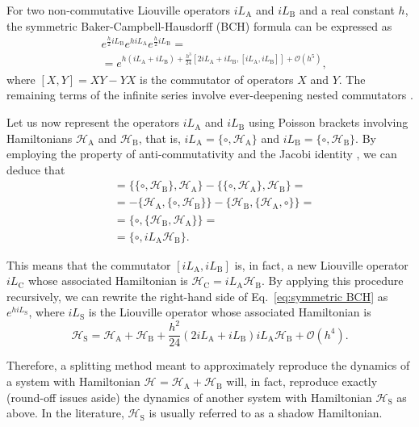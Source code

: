 \documentclass[
	aip,
	jcp,
	reprint,
]{revtex4-1}
\newcommand{\Ham}[1]{{\mathcal H}_\text{#1}}           %
\newcommand{\Liu}[1]{i\!L_\text{#1}}                   %
\newcommand{\timestep}{h}
\begin{document}
For two non-commutative Liouville operators $\Liu A$ and $\Liu B$ and a real constant $\timestep$, the symmetric Baker-Campbell-Hausdorff (BCH) formula can be expressed as \cite{Hairer_2006}
\begin{equation}
\label{eq:symmetric BCH}
\begin{split}
&e^{\frac{\timestep}{2} \Liu B} e^{\timestep \Liu A} e^{\frac{\timestep}{2} \Liu B} = \\
&= e^{\timestep (\Liu A + \Liu B) + \frac{\timestep^3}{24} \left[2 \Liu A + \Liu B,[\Liu A,\Liu B]\right] + \mathcal{O}(\timestep^5)},
\end{split}
\end{equation}
where $[X,Y] = XY - YX$ is the commutator of operators $X$ and $Y$.
The remaining terms of the infinite series involve ever-deepening nested commutators \cite{Hairer_2006}.

Let us now represent the operators $\Liu A$ and $\Liu B$ using Poisson brackets involving Hamiltonians $\Ham A$ and $\Ham B$, that is, $\Liu A = \{\circ,\Ham A\}$ and $\Liu B = \{\circ,\Ham B\}$.
By employing the property of anti-commutativity and the Jacobi identity \cite{Hairer_2006}, we can deduce that
\begin{align*}
[\Liu A,\Liu B] &= \{\{\circ,\Ham B\},\Ham A\} - \{\{\circ,\Ham A\},\Ham B\} = \\
&= -\{\Ham A,\{\circ,\Ham B\}\} - \{\Ham B,\{\Ham A,\circ\}\} = \\
&= \{\circ,\{\Ham B,\Ham A\}\} = \\
&= \{\circ,{\Liu A} {\Ham B}\}.
\end{align*}

This means that the commutator $[\Liu A,\Liu B]$ is, in fact, a new Liouville operator $\Liu C$ whose associated Hamiltonian is $\Ham C = {\Liu A}{\Ham B}$.
By applying this procedure recursively, we can rewrite the right-hand side of Eq.~\eqref{eq:symmetric BCH} as $e^{\timestep \Liu S}$, where $\Liu S$ is the Liouville operator whose associated Hamiltonian is
\begin{equation*}
\label{eq:general shadow hamiltonian}
\Ham{S} = \Ham A + \Ham B + \frac{\timestep^2}{24} (2 \Liu A + \Liu B){\Liu A}{\Ham B} + \mathcal{O}(\timestep^4).
\end{equation*}

Therefore, a splitting method meant to approximately reproduce the dynamics of a system with Hamiltonian $\Ham{} = \Ham A + \Ham B$ will, in fact, reproduce exactly (round-off issues aside) the dynamics of another system with Hamiltonian $\Ham{S}$ as above.
In the literature, $\Ham{S}$ is usually referred to as a shadow Hamiltonian.
\end{document}
